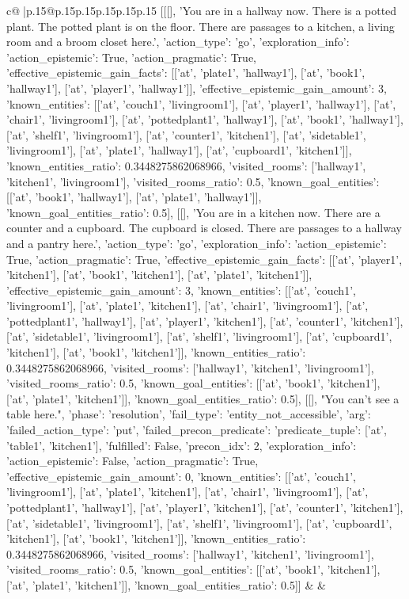 \documentclass{article}
\begin{document}
{\begin{supertabular}{c@{$\;$}|p{.15\linewidth}@{}p{.15\linewidth}p{.15\linewidth}p{.15\linewidth}p{.15\linewidth}p{.15\linewidth}}
{{{	 [[[], 'You are in a hallway now. There is a potted plant. The potted plant is on the floor. There are passages to a kitchen, a living room and a broom closet here.', {'action_type': 'go', 'exploration_info': {'action_epistemic': True, 'action_pragmatic': True, 'effective_epistemic_gain_facts': [['at', 'plate1', 'hallway1'], ['at', 'book1', 'hallway1'], ['at', 'player1', 'hallway1']], 'effective_epistemic_gain_amount': 3, 'known_entities': [['at', 'couch1', 'livingroom1'], ['at', 'player1', 'hallway1'], ['at', 'chair1', 'livingroom1'], ['at', 'pottedplant1', 'hallway1'], ['at', 'book1', 'hallway1'], ['at', 'shelf1', 'livingroom1'], ['at', 'counter1', 'kitchen1'], ['at', 'sidetable1', 'livingroom1'], ['at', 'plate1', 'hallway1'], ['at', 'cupboard1', 'kitchen1']], 'known_entities_ratio': 0.3448275862068966, 'visited_rooms': ['hallway1', 'kitchen1', 'livingroom1'], 'visited_rooms_ratio': 0.5, 'known_goal_entities': [['at', 'book1', 'hallway1'], ['at', 'plate1', 'hallway1']], 'known_goal_entities_ratio': 0.5}}], [[], 'You are in a kitchen now. There are a counter and a cupboard. The cupboard is closed. There are passages to a hallway and a pantry here.', {'action_type': 'go', 'exploration_info': {'action_epistemic': True, 'action_pragmatic': True, 'effective_epistemic_gain_facts': [['at', 'player1', 'kitchen1'], ['at', 'book1', 'kitchen1'], ['at', 'plate1', 'kitchen1']], 'effective_epistemic_gain_amount': 3, 'known_entities': [['at', 'couch1', 'livingroom1'], ['at', 'plate1', 'kitchen1'], ['at', 'chair1', 'livingroom1'], ['at', 'pottedplant1', 'hallway1'], ['at', 'player1', 'kitchen1'], ['at', 'counter1', 'kitchen1'], ['at', 'sidetable1', 'livingroom1'], ['at', 'shelf1', 'livingroom1'], ['at', 'cupboard1', 'kitchen1'], ['at', 'book1', 'kitchen1']], 'known_entities_ratio': 0.3448275862068966, 'visited_rooms': ['hallway1', 'kitchen1', 'livingroom1'], 'visited_rooms_ratio': 0.5, 'known_goal_entities': [['at', 'book1', 'kitchen1'], ['at', 'plate1', 'kitchen1']], 'known_goal_entities_ratio': 0.5}}], [[], "You can't see a table here.", {'phase': 'resolution', 'fail_type': 'entity_not_accessible', 'arg': {'failed_action_type': 'put', 'failed_precon_predicate': {'predicate_tuple': ['at', 'table1', 'kitchen1'], 'fulfilled': False, 'precon_idx': 2}}, 'exploration_info': {'action_epistemic': False, 'action_pragmatic': True, 'effective_epistemic_gain_amount': 0, 'known_entities': [['at', 'couch1', 'livingroom1'], ['at', 'plate1', 'kitchen1'], ['at', 'chair1', 'livingroom1'], ['at', 'pottedplant1', 'hallway1'], ['at', 'player1', 'kitchen1'], ['at', 'counter1', 'kitchen1'], ['at', 'sidetable1', 'livingroom1'], ['at', 'shelf1', 'livingroom1'], ['at', 'cupboard1', 'kitchen1'], ['at', 'book1', 'kitchen1']], 'known_entities_ratio': 0.3448275862068966, 'visited_rooms': ['hallway1', 'kitchen1', 'livingroom1'], 'visited_rooms_ratio': 0.5, 'known_goal_entities': [['at', 'book1', 'kitchen1'], ['at', 'plate1', 'kitchen1']], 'known_goal_entities_ratio': 0.5}}]] 
	  } 
	   } 
	   } 
	 & & \\ 
 


\end{supertabular}}
\end{document}
